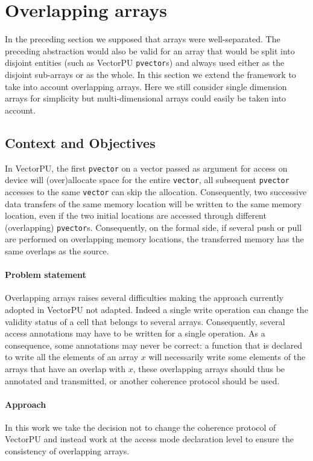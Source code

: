 \documentclass[preprint,12pt]{elsarticle}
\begin{document}
\section{Overlapping arrays}

In the preceding section we supposed that arrays were well-separated. The preceding abstraction would also be valid for an array that would be split into disjoint entities (such as
VectorPU \texttt{pvector}s) and always used either as the disjoint sub-arrays or as the whole. In this section we extend the framework to take into account overlapping arrays. Here we still consider single dimension arrays for simplicity but multi-dimensional arrays could easily be taken into account.

\subsection{Context and Objectives}

In VectorPU, the first \texttt{pvector} on a vector passed as argument for access on device will (over)allocate space for the entire \texttt{vector}, all subsequent \texttt{pvector} accesses to the same \texttt{vector} can skip the allocation.
 Consequently, two successive data transfers of the same memory location will be written to the same memory location, even if the two initial locations are accessed through different (overlapping) \texttt{pvector}s.
Consequently, on the formal side, if several push or pull are performed on overlapping memory locations, the transferred memory has the same overlaps as the source.

\paragraph{Problem statement}
Overlapping arrays raises several difficulties making the approach currently adopted in VectorPU not adapted. Indeed a single write operation can change the validity status of a cell that belongs to several arrays. Consequently, several access annotations may have to be written for a single operation. As a consequence, some annotations may never be correct: a function that is declared to write all the elements of an array $x$ will necessarily write some elements of the arrays that have an overlap with $x$, these overlapping arrays should thus be annotated and transmitted, or another coherence protocol should be used.

\paragraph{Approach}
In this work we take the decision not to change the coherence protocol of VectorPU and instead work at the access mode declaration level to ensure the consistency of overlapping arrays.
\end{document}
